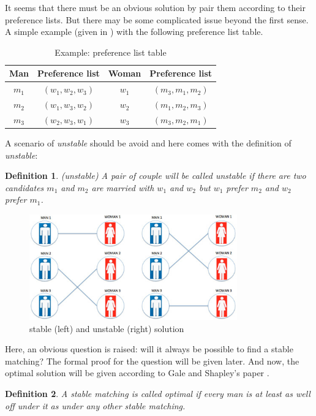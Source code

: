 \documentclass[14pt]{extarticle}
\newtheorem{definition}{Definition}
\begin{document}
It seems that there must be an obvious solution by pair them according to their preference lists. 
But there may be some complicated issue beyond the first sense.
A simple example (given in \cite{physicist}) with the following preference list table.
\begin{table}[H] \label{stable_marriage_example}
  \center
  \begin{tabular}{|c|c|c|c|}
    \hline
    Man & Preference list & Woman & Preference list \\
    \hline
    \hline
    $m_1$ & $(w_1, w_2, w_3)$ & $w_1$ & $(m_3, m_1, m_2)$ \\
    \hline
    $m_2$ & $(w_1, w_3, w_2)$ & $w_2$ & $(m_1, m_2, m_3)$ \\
    \hline
    $m_3$ & $(w_2, w_3, w_1)$ & $w_3$ & $(m_3, m_2, m_1)$ \\
    \hline
  \end{tabular}
  \caption{Example: preference list table \cite{physicist}}
\end{table}
A scenario of {\it unstable} should be avoid and here comes with the definition of {\it unstable}:
\begin{definition}
  (unstable)
  A pair of couple will be called unstable if there are two candidates $m_1$ and $m_2$ are married with $w_1$ and $w_2$ but $w_1$ prefer $m_2$ and $w_2$ prefer $m_1$.
\end{definition}
\begin{figure}[H]
  \centering
  \includegraphics[width=0.8\textwidth]{stable_unstable.jpg}
  \caption{stable (left) and unstable (right) solution \cite{physicist}}
\end{figure}
Here, an obvious question is raised: will it always be possible to find a stable matching?
The formal proof for the question will be given later. 
And now, the optimal solution will be given according to Gale and Shapley's paper \cite{GS1962}.
\begin{definition}
  A stable matching is called optimal if every man is at least as well off under it as under any other stable matching.
\end{definition}  
\end{document}

